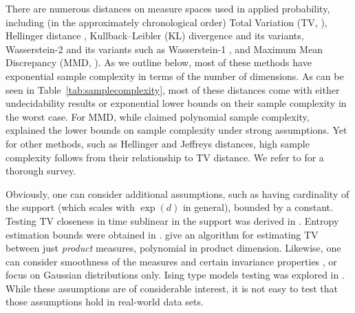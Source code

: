 There are numerous distances on measure spaces used in applied probability, including (in the approximately chronological order)
Total Variation (TV, \cite{zbMATH02706589}),
Hellinger distance \cite{hellinger1909neue},
Kullback–Leibler (KL) divergence \cite{KL} and its variants,
Wasserstein-2 \cite{vaserstein1969markov,dudley1969speed} and its variants such as Wasserstein-1 \cite{vaserstein1969markov},  and
Maximum Mean Discrepancy (MMD, \cite{gretton2012kernel}).
As we outline below,   most of these methods have exponential sample complexity in terms of the number of dimensions.
As can be seen in Table~\ref{tab:samplecomplexity}, most of these distances come with either undecidability results \cite{lee2023computability} or
exponential lower bounds on their sample complexity in the worst case.
For MMD, while \cite{gretton2012kernel} claimed polynomial sample complexity,  \cite{NIPS2016_5055cbf4} explained the lower bounds on sample complexity under strong assumptions.
Yet for other methods, such as Hellinger and Jeffreys distances, %
high sample complexity follows from their relationship to TV distance.
We refer to \cite{panaretos2019statistical} for a thorough survey.

Obviously, one can consider additional assumptions, such as having cardinality of the support (which scales with $\exp(d)$ in general), bounded by a constant. Testing TV closeness in time sublinear in the support was derived in
\cite{chan2014optimal}.
Entropy estimation bounds were obtained in \cite{valiant2011estimating}.
\cite{feng2023simple,bhattacharyya2022approximating} give an algorithm for estimating TV between just \emph{product} measures, polynomial in product dimension.
Likewise, one can consider smoothness of the measures and certain invariance properties \cite{chen2023sample,tahmasebisample}, or focus on Gaussian distributions \cite{hsu2024polynomial} only.
Ising type models testing was explored in \cite{kandiros2023learning}. While these assumptions are of considerable interest,
it is not easy to test that those assumptions hold in real-world data sets.

